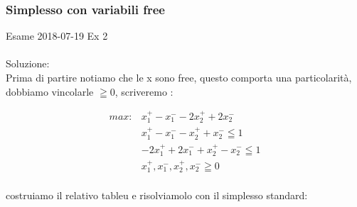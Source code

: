 \documentclass{article}
\begin{document}
\subsubsection{Simplesso con variabili free}
Esame 2018-07-19 Ex 2\\
\noindent{}%
\\
Soluzione: \\
Prima di partire notiamo che le x sono free, questo comporta una particolarità, dobbiamo vincolarle $\geqq 0$, scriveremo :\\
\begin{center}
\begin{align*}
max: &x_1^+ - x_1^- -2x_2^+ + 2x_2^-\\
&x_1^+ -x_1^- - x_2^+ + x_2^- \leqq 1\\
&-2x_1^+ + 2x_1^- + x_2^+ -x_2^- \leqq 1\\
&x_1^+ ,x_1^-,x_2^+,x_2^- \geqq 0\\
\end{align*}
\end{center}

costruiamo il relativo tableu e risolviamolo con il simplesso standard:\\

\begin{center}
\end{center}
\end{document}
